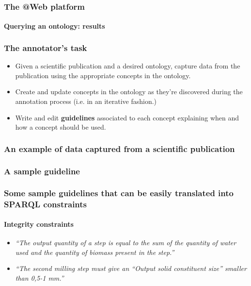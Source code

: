 \documentclass{beamer}
\begin{document}
\begin{frame}
  \frametitle{The \textbf{@Web} platform}
  \framesubtitle{Querying an ontology: results}

  \begin{center}
  \end{center}
\end{frame}

\begin{frame}
  \frametitle{The annotator's task}

  \begin{itemize}
    \item Given a scientific publication and a desired ontology, capture data
      from the publication using the appropriate concepts in the ontology.

    \pause

    \item Create and update concepts in the ontology as they're discovered
      during the annotation process (i.e. in an iterative fashion.)

    \pause

    \item Write and edit \textbf{guidelines} associated to each concept
      explaining when and how a concept should be used.
  \end{itemize}
\end{frame}

\begin{frame}
  \frametitle{An example of data captured from a scientific publication}

  \begin{center}
  \end{center}
\end{frame}

\begin{frame}
  \frametitle{A sample guideline}

  \begin{center}
  \end{center}
\end{frame}

\begin{frame}
  \frametitle{Some sample guidelines that can be easily translated into SPARQL
  constraints}
  \framesubtitle{Integrity constraints}

  \begin{itemize}
    \item \textit{``The output quantity of a step is equal to the sum of the
      quantity of water used and the quantity of biomass present in the
    step.''}

    \pause

    \item \textit{``The second milling step must give an “Output solid
      constituent size” smaller than 0,5-1 mm.''}
  \end{itemize}
\end{frame}
\end{document}
